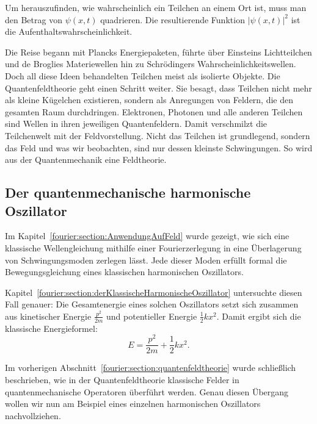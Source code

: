	
	Um herauszufinden, wie wahrscheinlich ein Teilchen an einem Ort ist, muss man den Betrag von $\psi(x, t)$ quadrieren. 
	Die resultierende Funktion $|\psi(x, t)|^2$ ist die Aufenthaltswahrscheinlichkeit. 
	
	Die Reise begann mit Plancks Energiepaketen, führte über Einsteins Lichtteilchen und de Broglies Materiewellen hin zu Schrödingers Wahrscheinlichkeitswellen. 
	Doch all diese Ideen behandelten Teilchen meist als isolierte Objekte.
	Die Quantenfeldtheorie geht einen Schritt weiter.
	Sie besagt, dass Teilchen nicht mehr als kleine Kügelchen existieren, sondern als Anregungen von Feldern, die den gesamten Raum durchdringen. 
	Elektronen, Photonen und alle anderen Teilchen sind Wellen in ihren jeweiligen Quantenfeldern.
	Damit verschmilzt die Teilchenwelt mit der Feldvorstellung.
	Nicht das Teilchen ist grundlegend, sondern das Feld und was wir beobachten, sind nur dessen kleinste Schwingungen.
	So wird aus der Quantenmechanik eine Feldtheorie.
	
	\subsection{Der quantenmechanische harmonische Oszillator\label{fourier:subsection:derQMHarmonischeOszillator}}

	Im Kapitel~\ref{fourier:section:AnwendungAufFeld} wurde gezeigt, wie sich eine klassische Wellengleichung mithilfe einer Fourierzerlegung in eine Überlagerung von Schwingungsmoden zerlegen lässt.  
	Jede dieser Moden erfüllt formal die Bewegungsgleichung eines klassischen harmonischen Oszillators.

	Kapitel~\ref{fourier:section:derKlassischeHarmonischeOszillator} untersuchte diesen Fall genauer:  
	Die Gesamtenergie eines solchen Oszillators setzt sich zusammen aus kinetischer Energie \( \frac{p^2}{2m} \) und potentieller Energie \( \frac{1}{2}kx^2 \).  
	Damit ergibt sich die klassische Energieformel:
	\begin{equation}
	E = \frac{p^2}{2m} + \frac{1}{2}kx^2.
	\end{equation}

	Im vorherigen Abschnitt~\ref{fourier:section:quantenfeldtheorie} wurde schließlich beschrieben, wie in der Quantenfeldtheorie klassische Felder in quantenmechanische Operatoren überführt werden.  
	Genau diesen Übergang wollen wir nun am Beispiel eines einzelnen harmonischen Oszillators nachvollziehen.

	\vspace{1em}

